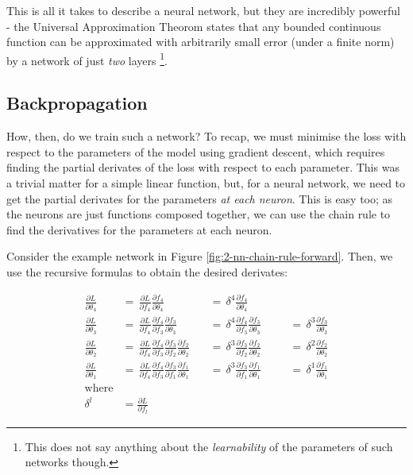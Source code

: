 This is all it takes to describe a neural network, but they are incredibly powerful -
the Universal Approximation Theorom \cite{Cybenkot1989, Hornik1989}\cite[p.~105]{Mitchell1997-ML} states that any bounded continuous function can be approximated with arbitrarily small error (under a finite norm) by a network of just \textit{two} layers
\footnote{This does not say anything about the \textit{learnability} of the parameters of such networks though.}.

\subsection{Backpropagation}
How, then, do we train such a network?
To recap, we must minimise the loss with respect to the parameters of the model using gradient descent, which requires finding the partial derivates of the loss with respect to each parameter.
This was a trivial matter for a simple linear function, but, for a neural network, we need to get the partial derivates for the parameters \textit{at each neuron}.
This is easy too; as the neurons are just functions composed together, we can use the chain rule to find the derivatives for the parameters at each neuron.

Consider the example network in Figure \ref{fig:2-nn-chain-rule-forward}.
Then, we use the recursive formulas to obtain the desired derivates:

\begin{align*}
    \frac{\partial L}{\partial \theta_4} \,&=\, \frac{\partial L}{\partial f_4}\frac{\partial f_4}{\partial \theta_4} \,&&=\, \delta^4\frac{\partial f_4}{\partial \theta_4} \\[0.5em]
    \frac{\partial L}{\partial \theta_3} \,&=\, \frac{\partial L}{\partial f_4}\frac{\partial f_4}{\partial f_3}\frac{\partial f_3}{\partial \theta_3} \,&&=\, \delta^4\frac{\partial f_4}{\partial f_3}\frac{\partial f_3}{\partial \theta_3} \,&&&=\, \delta^3\frac{\partial f_3}{\partial \theta_3} \\[0.5em]
    \frac{\partial L}{\partial \theta_2} \,&=\, \frac{\partial L}{\partial f_4}\frac{\partial f_4}{\partial f_3}\frac{\partial f_3}{\partial f_2}\frac{\partial f_2}{\partial \theta_2} \,&&=\, \delta^3\frac{\partial f_3}{\partial f_2}\frac{\partial f_2}{\partial \theta_2} \,&&&=\, \delta^2\frac{\partial f_2}{\partial \theta_2} \\[0.5em]
    \frac{\partial L}{\partial \theta_1} \,&=\, \frac{\partial L}{\partial f_4}\frac{\partial f_4}{\partial f_3}\frac{\partial f_3}{\partial f_1}\frac{\partial f_1}{\partial \theta_1} \,&&=\, \delta^3\frac{\partial f_3}{\partial f_1}\frac{\partial f_1}{\partial \theta_1} \,&&&=\, \delta^1\frac{\partial f_1}{\partial \theta_1} \\[0.5em]
    \text{where}\\[0.6em]
    \delta^l &= \frac{\partial L}{\partial f_l}
\end{align*}

